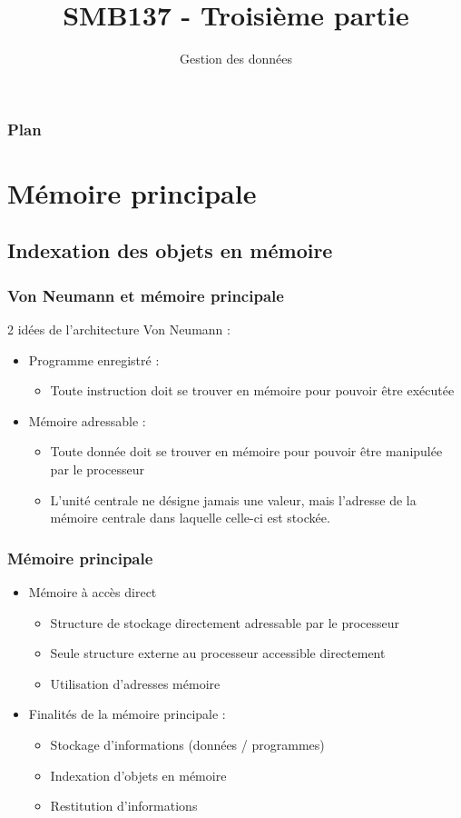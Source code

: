 

\title{SMB137 - Troisième partie}
\subtitle{Gestion des données}


\frame[plain]{\titlepage}

\begin{frame}
 \frametitle{Plan}
 \tableofcontents
\end{frame}

\section{Mémoire principale}

\subsection{Indexation des objets en mémoire}

\begin{frame}
 \frametitle{Von Neumann et mémoire principale}
2 idées de l’architecture Von Neumann :
\begin{itemize}
	\item Programme enregistré :
  	\begin{itemize}
  	\item Toute instruction doit se trouver en mémoire pour pouvoir être exécutée
  	\end{itemize}
	\item Mémoire adressable :
	 \begin{itemize}
   \item Toute donnée doit se trouver en mémoire pour pouvoir être manipulée par le processeur
	 \item L’unité centrale ne désigne jamais une valeur, mais l’adresse de la mémoire centrale dans laquelle celle-ci est stockée.
	 \end{itemize}
\end{itemize}
\end{frame}

\begin{frame}
\frametitle{Mémoire principale}
\begin{itemize}
\item <1> Mémoire à accès direct
\begin{itemize}
\item Structure de stockage directement adressable par le processeur
\item Seule structure externe au processeur accessible directement
\item Utilisation d'adresses mémoire
\end{itemize}

\item <2> Finalités de la mémoire principale :
\begin{itemize}
	\item Stockage d'informations (données / programmes)
	\item Indexation d'objets en mémoire
	\item Restitution d'informations
\end{itemize}

\end{itemize}
\end{frame}


